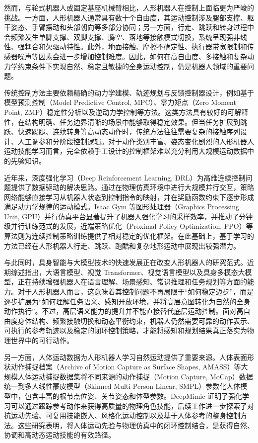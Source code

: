 然而，与轮式机器人或固定基座机械臂相比，人形机器人在控制上面临更为严峻的挑战。一方面，人形机器人通常具有数十个自由度，其运动控制涉及腿部支撑、躯干姿态、手臂摆动和头部朝向等多部分协同；另一方面，行走、跳跃和转身过程中会频繁发生单脚支撑、双脚支撑、腾空、落地等接触模式切换，系统呈现强非线性、强耦合和欠驱动特性。此外，地面接触、摩擦不确定性、执行器带宽限制和传感器噪声等因素会进一步增加控制难度。因此，如何在高自由度、多接触和复杂动力学约束条件下实现自然、稳定且敏捷的全身运动控制，仍是机器人领域的重要问题。

传统控制方法主要依赖精确的动力学建模、轨迹规划与反馈控制器设计，例如基于模型预测控制（Model Predictive Control, MPC）、零力矩点（Zero Moment Point, ZMP）稳定性分析以及逆动力学控制等方法。这类方法具有较好的可解释性，在结构明确、任务边界清晰的场景中能够取得稳定效果。但当任务扩展到跳跃、快速踢腿、连续转身等高动态动作时，传统方法往往需要复杂的接触序列设计、人工调参和分阶段控制逻辑。对于动作类别丰富、姿态变化剧烈的人形机器人运动技能学习而言，完全依赖手工设计的控制框架难以充分利用大规模运动数据中的先验知识。

近年来，深度强化学习（Deep Reinforcement Learning, DRL）为高维连续控制问题提供了数据驱动的解决思路。通过在物理仿真环境中进行大规模并行交互，策略网络能够直接学习从机器人状态到控制指令的映射，并在奖励函数约束下逐步形成满足动力学规律的运动模式。Isaac Gym 等图形处理器（Graphics Processing Unit, GPU）并行仿真平台显著提升了机器人强化学习的采样效率，并推动了分钟级并行训练范式的发展\cite{isaacgym2021,rudin2022learning,margolis2022rapid}，近端策略优化（Proximal Policy Optimization, PPO）等算法则为连续控制策略训练提供了相对稳定的优化框架\cite{ppo2017}。在此基础上，基于学习的方法已经在人形机器人行走、跳跃、跑酷和复杂地形运动中展现出较强潜力\cite{xie2020learning,radosavovic2402humanoid,zhuang2024humanoid,gu2024advancing,long2024learning,zhang2024whole}。

与此同时，具身智能与大模型技术的快速发展正在改变人形机器人的研究范式。近期综述指出，大语言模型、视觉 Transformer、视觉语言模型以及具身多模态大模型，正在持续增强机器人在语言理解、场景感知、常识推理和任务规划等方面的能力\cite{zeng2025embodied}。对于人形机器人而言，这意味着其控制问题不再局限于“如何稳定迈步”，而是逐步扩展为“如何理解任务语义、感知开放环境，并将高层意图转化为自然的全身动作执行”。不过，高层语义能力的提升并不能直接替代底层运动控制。面对高自由度身体结构、频繁接触切换和动态平衡约束，机器人仍然需要可靠的动作表示、可执行的参考轨迹以及稳定的闭环控制策略，才能将感知和规划结果真正落实为物理世界中的可行动作。

另一方面，人体运动数据为人形机器人学习自然运动提供了重要来源。人体表面形状动作捕捉档案（Archive of Motion Capture as Surface Shapes, AMASS）等大规模人体运动捕捉数据集将不同来源的动作捕捉（Motion Capture, MoCap）数据统一到多人线性蒙皮模型（Skinned Multi-Person Linear, SMPL）参数化人体模型中，包含丰富的根节点位姿、关节姿态和体型参数\cite{amass2019}。DeepMimic 证明了强化学习可以通过跟踪参考动作来获得高质量的物理角色技能\cite{deepmimic2018}，后续工作进一步探索了对抗运动先验、可复用技能嵌入、风格化运动控制以及基于人体参考的整身控制方法\cite{peng2021amp,peng2022ase,tessler2024maskedmimic,luo2023perpetual}。这些研究表明，将人体运动先验与物理仿真中的闭环控制结合，是获得自然、协调和高动态运动技能的有效路径。

